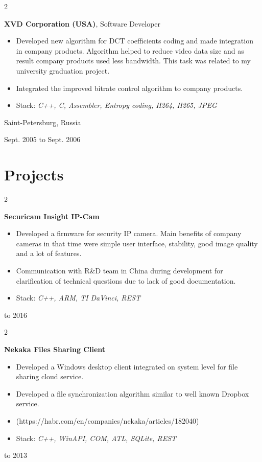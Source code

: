 \documentclass[10pt, letterpaper]{article}
\newenvironment{highlights}{
    \begin{itemize}[
        topsep=0.10 cm,
        parsep=0.10 cm,
        partopsep=0pt,
        itemsep=0pt,
        leftmargin=0.4 cm + 10pt
    ]
}{
    \end{itemize}
} %
\newenvironment{twocolentry}[2][]{
    \onecolentry
    \def\secondColumn{#2}
    \setcolumnwidth{\fill, 4.5 cm}
    \begin{paracol}{2}
}{
    \switchcolumn \raggedleft \secondColumn
    \end{paracol}
    \endonecolentry
} %
\begin{document}
        \begin{twocolentry}{
            Saint-Petersburg, Russia

        Sept. 2005 to Sept. 2006
        }
            \textbf{XVD Corporation (USA)}, Software Developer
            \begin{highlights}
                \item Developed new algorithm for DCT coefficients coding and made integration in company products. Algorithm helped to reduce video data size and as result company products used less bandwidth. This task was related to my university graduation project.
                \item Integrated the improved bitrate control algorithm to company products.
                \item Stack: \textit{C++, C, Assembler, Entropy coding, H264, H265, JPEG}
            \end{highlights}
        \end{twocolentry}



    
    \section{Projects}

        
        \begin{twocolentry}{
            2014 to 2016
        }
            \textbf{Securicam Insight IP-Cam}
            \begin{highlights}
                \item Developed a firmware for security IP camera. Main benefits of company cameras in that time were simple user interface, stability, good image quality and a lot of features.
                \item Communication with R\&D team in China during development for clarification of technical questions due to lack of good documentation.
                \item Stack: \textit{C++, ARM, TI DaVinci, REST}
            \end{highlights}
        \end{twocolentry}


        \vspace{0.2 cm}

        \begin{twocolentry}{
            2012 to 2013
        }
            \textbf{Nekaka Files Sharing Client}
            \begin{highlights}
                \item Developed a Windows desktop client integrated on system level for file sharing cloud service.
                \item Developed a file synchronization algorithm similar to well known Dropbox service.
                \item (https://habr.com/en/companies/nekaka/articles/182040)\
                \item Stack: \textit{C++, WinAPI, COM, ATL, SQLite, REST}
            \end{highlights}
        \end{twocolentry}
\end{document}
